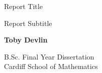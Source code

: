 
\begin{titlepage}
    \begin{center}
        \vspace*{5cm}

		Report Title 

        \vspace{0.5cm}
        Report Subtitle

        \vspace{1.5cm}\textit{}

        \textbf{Toby Devlin}
        \vfill

        B.Sc. Final Year Dissertation\\

        \vspace{0.5cm}
        Cardiff School of Mathematics

        \vspace{1.5cm}



    \end{center}
\end{titlepage}